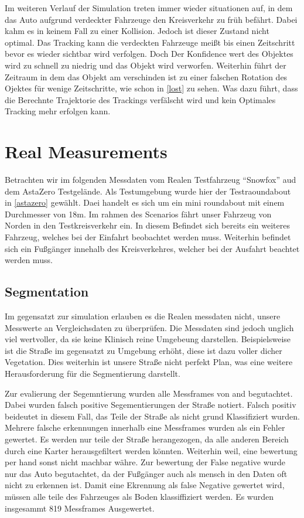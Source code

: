 \documentclass[11pt,oneside,openright]{mpreport}
\begin{document}
Im weiteren Verlauf der Simulation treten immer wieder situationen auf, in dem das Auto aufgrund verdeckter Fahrzeuge den Kreisverkehr zu früh befährt.
Dabei kahm es in keinem Fall zu einer Kollision. Jedoch ist dieser Zustand nicht optimal. Das Tracking kann die verdeckten Fahrzeuge meißt bis einen Zeitschritt
bevor es wieder sichtbar wird verfolgen. Doch Der Konfidence wert des Objektes wird zu schnell zu niedrig und das Objekt wird verworfen. Weiterhin führt der Zeitraum in dem das Objekt am verschinden ist
zu einer falschen Rotation des Ojektes für wenige Zeitschritte, wie schon in \cref{lost} zu sehen. Was dazu führt, dass die Berechnte Trajektorie des Trackings verfälscht wird und kein
Optimales Tracking mehr erfolgen kann.

\section{Real Measurements}

Betrachten wir im folgenden Messdaten vom Realen Testfahrzeug ``Snowfox'' aud dem AstaZero Testgelände. 
Als Testumgebung wurde hier der Testraoundabout in \cref{astazero} gewählt. Daei handelt es sich um ein mini roundabout mit einem Durchmesser von 18m.
Im rahmen des Scenarios fährt unser Fahrzeug von Norden in den Testkreisverkehr ein.
In diesem Befindet sich bereits ein weiteres Fahrzeug, welches bei der Einfahrt beobachtet werden muss. Weiterhin befindet sich ein Fußgänger innehalb des Kreisverkehres, welcher
bei der Ausfahrt beachtet werden muss.

\subsection{Segmentation}

Im gegensatzt zur simulation erlauben es die Realen messdaten nicht, unsere Messwerte an Vergleichsdaten zu überprüfen. Die Messdaten sind jedoch unglich viel wertvoller,
da sie keine Klinisch reine Umgebeung darstellen. Beispielsweise ist die Straße im gegensatzt zu Umgebung erhöht, diese ist dazu voller dicher Vegetation.
Dies weiterhin ist unsere Straße nicht perfekt Plan, was eine weitere Herausforderung für die Segmentierung darstellt.

Zur evalierung der Segemntierung wurden alle Messframes von and begutachtet. Dabei wurden falsch positive Segementierungen der Straße notiert.
Falsch positiv beideutet in diesem Fall, das Teile der Straße als nicht grund Klassifiziert wurden. 
Mehrere falsche erkennungen innerhalb eine Messframes wurden als ein Fehler gewertet.
Es werden nur teile der Straße herangezogen, da alle anderen Bereich durch eine Karter herausgefiltert werden könnten. Weiterhin weil, eine bewertung per hand sonst nicht machbar währe.
Zur bewertung der False negative wurde nur das Auto begutachtet,
da der Fußgänger auch als mensch in den Daten oft nicht zu erkennen ist. Damit eine Ekrennung als false Negative gewertet wird, müssen alle
teile des Fahrzeuges als Boden klassiffiziert werden. Es wurden insgesammt 819 Messframes Ausgewertet.
\end{document}
